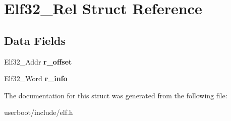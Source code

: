 \hypertarget{structElf32__Rel}{}\section{Elf32\+\_\+\+Rel Struct Reference}
\label{structElf32__Rel}
\subsection*{Data Fields}
\begin{DoxyCompactItemize}
\item 
Elf32\+\_\+\+Addr {\bfseries r\+\_\+offset}\hypertarget{structElf32__Rel_addcf5ef67ababeb4940889e912c11eff}{}\label{structElf32__Rel_addcf5ef67ababeb4940889e912c11eff}

\item 
Elf32\+\_\+\+Word {\bfseries r\+\_\+info}\hypertarget{structElf32__Rel_a81c52bb1589056c5d37d58b9bfe2a046}{}\label{structElf32__Rel_a81c52bb1589056c5d37d58b9bfe2a046}

\end{DoxyCompactItemize}


The documentation for this struct was generated from the following file\+:\begin{DoxyCompactItemize}
\item 
userboot/include/elf.\+h\end{DoxyCompactItemize}
